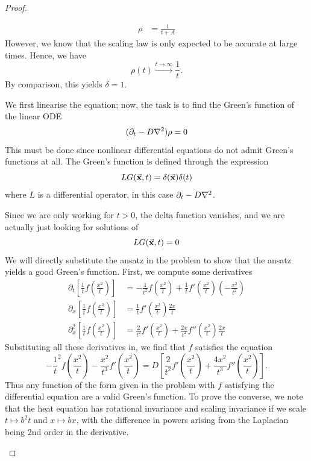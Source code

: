 \begin{proof}
\begin{parts}
\begin{align*}
			\rho &= \frac{1}{t+A}
		\end{align*}
		However, we know that the scaling law is only expected to be accurate at large times. Hence, we have
		\[\rho(t) \xrightarrow{t\to\infty} \frac 1t.\]
		By comparison, this yields $\delta=1$.
		\item We first linearise the equation; now, the task is to find the Green's function of the linear ODE
		\[(\partial_t - D\laplacian)\rho = 0\]
		This must be done since nonlinear differential equations do not admit Green's functions at all. The Green's function is defined through the expression
		\[LG(\va x, t)= \delta(\va x)\delta(t)\]
		where $L$ is a differential operator, in this case $\partial_t - D\laplacian$.
		
		Since we are only working for $t>0$, the delta function vanishes, and we are actually just looking for solutions of
		\[LG(\va x, t)=0\]
		We will directly substitute the ansatz in the problem to show that the ansatz yields a good Green's function. First, we compute some derivatives
		\begin{align*}
			\partial_t\left[\frac 1t f\left(\frac{x^2}{t}\right)\right]&= -\frac 1{t^2}f\left(\frac{x^2}{t}\right) + \frac 1t f'\left(\frac{x^2}{t}\right)\left(-\frac{x^2}{t^2}\right) \\
			\partial_x\left[\frac 1t f\left(\frac{x^2}{t}\right)\right] &= \frac 1t f'\left(\frac{x^2}{t}\right)\frac{2x}{t} \\
			\partial_x^2\left[\frac 1t f\left(\frac{x^2}{t}\right)\right] &= \frac{2}{t^2}f'\left(\frac{x^2}{t}\right) + \frac{2x}{t^2}f''\left(\frac{x^2}{t}\right) \frac{2x}{t} 			
		\end{align*}
		Substituting all these derivatives in, we find that $f$ satisfies the equation
		\[-\frac 1t^2f\left(\frac{x^2}{t}\right) - \frac{x^2}{t^3} f'\left(\frac{x^2}{t}\right) = D\left[\frac 2{t^2}f'\left(\frac{x^2}{t}\right)+ \frac{4x^2}{t^3} f''\left(\frac{x^2}{t}\right)\right].\]
		Thus any function of the form given in the problem with $f$ satisfying the differential equation are a valid Green's function. To prove the converse, we note that the heat equation has rotational invariance and scaling invariance if we scale $t\mapsto b^2 t$ and $x \mapsto b x$, with the difference in powers arising from the Laplacian being 2nd order in the derivative. \qedhere
	\end{parts}
\end{proof}
